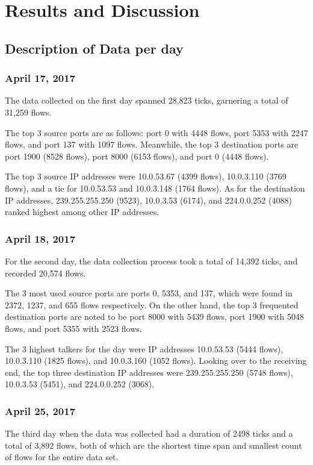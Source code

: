 \documentclass[journal]{IEEE/IEEEtran}
\begin{document}
\section{Results and Discussion}

\subsection{Description of Data per day}

\subsubsection{\textbf{April 17, 2017}}
The data collected on the first day spanned 28,823 ticks, garnering a total of 31,259 flows.

The top 3 source ports are as follows: port 0 with 4448 flows, port 5353 with 2247 flows, and port 137 with 1097 flows. Meanwhile, the top 3 destination ports are port 1900 (8528 flows), port 8000 (6153 flows), and port 0 (4448 flows).

The top 3 source IP addresses were 10.0.53.67 (4399 flows), 10.0.3.110 (3769 flows), and a tie for 10.0.53.53 and 10.0.3.148 (1764 flows). As for the destination IP addresses, 239.255.255.250 (9523), 10.0.3.53 (6174), and 224.0.0.252 (4088) ranked highest among other IP addresses.

\subsubsection{\textbf{April 18, 2017}}
For the second day, the data collection process took a total of 14,392 ticks, and recorded 20,574 flows.

The 3 most used source ports are ports 0, 5353, and 137, which were found in 2372, 1237, and 655 flows respectively. On the other hand, the top 3 frequented destination ports are noted to be port 8000 with 5439 flows, port 1900 with 5048 flows, and port 5355 with 2523 flows.

The 3 highest talkers for the day were IP addresses 10.0.53.53 (5444 flows), 10.0.3.110 (1825 flows), and 10.0.3.160 (1052 flows). Looking over to the receiving end, the top three destination IP addresses were 239.255.255.250 (5748 flows), 10.0.3.53 (5451), and 224.0.0.252 (3068).

\subsubsection{\textbf{April 25, 2017}}
The third day when the data was collected had a duration of 2498 ticks and a total of 3,892 flows, both of which are the shortest time span and smallest count of flows for the entire data set.
\end{document}

